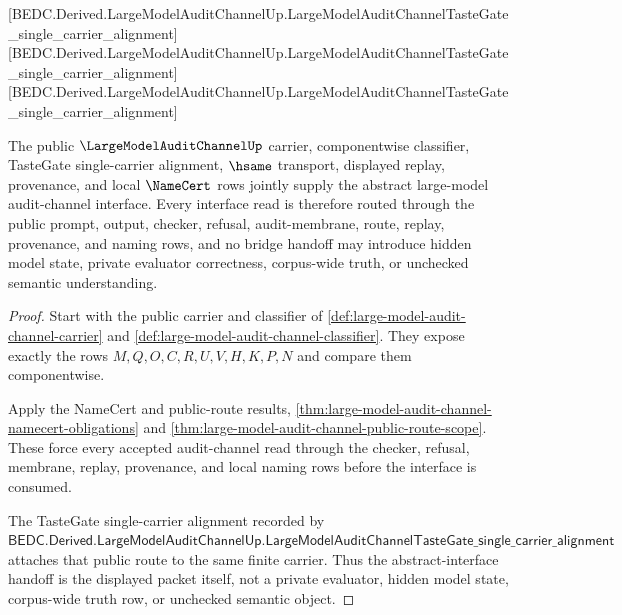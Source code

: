 [BEDC.Derived.LargeModelAuditChannelUp.LargeModelAuditChannelTasteGate\_single\_carrier\_alignment]
[BEDC.Derived.LargeModelAuditChannelUp.LargeModelAuditChannelTasteGate\_single\_carrier\_alignment]
[BEDC.Derived.LargeModelAuditChannelUp.LargeModelAuditChannelTasteGate\_single\_carrier\_alignment]

\begin{theorem}
\label{thm:large-model-audit-channel-abstract-interface-handoff}
The public $\LargeModelAuditChannelUp$ carrier, componentwise classifier, TasteGate single-carrier alignment, $\hsame$ transport, displayed replay, provenance, and local $\NameCert$ rows jointly supply the abstract large-model audit-channel interface. Every interface read is therefore routed through the public prompt, output, checker, refusal, audit-membrane, route, replay, provenance, and naming rows, and no bridge handoff may introduce hidden model state, private evaluator correctness, corpus-wide truth, or unchecked semantic understanding.
\end{theorem}
\begin{proof}
Start with the public carrier and classifier of \autoref{def:large-model-audit-channel-carrier} and \autoref{def:large-model-audit-channel-classifier}. They expose exactly the rows $M,Q,O,C,R,U,V,H,K,P,N$ and compare them componentwise.

Apply the NameCert and public-route results, \autoref{thm:large-model-audit-channel-namecert-obligations} and \autoref{thm:large-model-audit-channel-public-route-scope}. These force every accepted audit-channel read through the checker, refusal, membrane, replay, provenance, and local naming rows before the interface is consumed.

The TasteGate single-carrier alignment recorded by $\mathsf{BEDC.Derived.LargeModelAuditChannelUp.LargeModelAuditChannelTasteGate\_single\_carrier\_alignment}$ attaches that public route to the same finite carrier. Thus the abstract-interface handoff is the displayed packet itself, not a private evaluator, hidden model state, corpus-wide truth row, or unchecked semantic object.
\end{proof}

